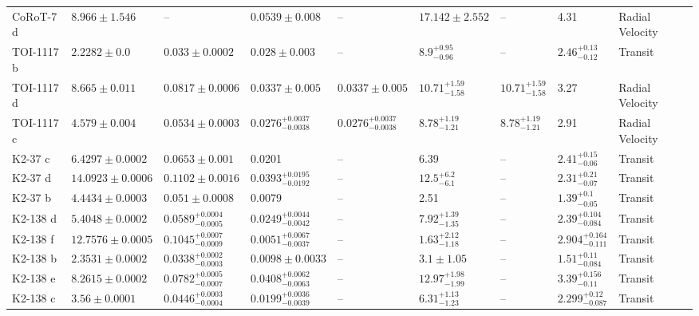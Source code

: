 \begin{tabular}{llllllllll}
CoRoT-7 d & $8.966 \pm 1.546$ & -- & $0.0539 \pm 0.008$ & -- & $17.142 \pm 2.552$ & -- & 4.31 & Radial Velocity & \cite{JOHN_ET_AL_2022} \\
TOI-1117 b & $2.2282 \pm 0.0$ & $0.033 \pm 0.0002$ & $0.028 \pm 0.003$ & -- & $8.9^{+0.95}_{-0.96}$ & -- & $2.46^{+0.13}_{-0.12}$ & Transit & \cite{LOCKLEY_ET_AL_2025} \\
TOI-1117 d & $8.665 \pm 0.011$ & $0.0817 \pm 0.0006$ & $0.0337 \pm 0.005$ & $0.0337 \pm 0.005$ & $10.71^{+1.59}_{-1.58}$ & $10.71^{+1.59}_{-1.58}$ & 3.27 & Radial Velocity & \cite{LOCKLEY_ET_AL_2025} \\
TOI-1117 c & $4.579 \pm 0.004$ & $0.0534 \pm 0.0003$ & $0.0276^{+0.0037}_{-0.0038}$ & $0.0276^{+0.0037}_{-0.0038}$ & $8.78^{+1.19}_{-1.21}$ & $8.78^{+1.19}_{-1.21}$ & 2.91 & Radial Velocity & \cite{LOCKLEY_ET_AL_2025} \\
K2-37 c & $6.4297 \pm 0.0002$ & $0.0653 \pm 0.001$ & 0.0201 & -- & 6.39 & -- & $2.41^{+0.15}_{-0.06}$ & Transit & \cite{HOWARD_ET_AL__2025} \\
K2-37 d & $14.0923 \pm 0.0006$ & $0.1102 \pm 0.0016$ & $0.0393^{+0.0195}_{-0.0192}$ & -- & $12.5^{+6.2}_{-6.1}$ & -- & $2.31^{+0.21}_{-0.07}$ & Transit & \cite{HOWARD_ET_AL__2025} \\
K2-37 b & $4.4434 \pm 0.0003$ & $0.051 \pm 0.0008$ & 0.0079 & -- & 2.51 & -- & $1.39^{+0.1}_{-0.05}$ & Transit & \cite{HOWARD_ET_AL__2025} \\
K2-138 d & $5.4048 \pm 0.0002$ & $0.0589^{+0.0004}_{-0.0005}$ & $0.0249^{+0.0044}_{-0.0042}$ & -- & $7.92^{+1.39}_{-1.35}$ & -- & $2.39^{+0.104}_{-0.084}$ & Transit & \cite{LOPEZ_ET_AL__2019} \\
K2-138 f & $12.7576 \pm 0.0005$ & $0.1045^{+0.0007}_{-0.0009}$ & $0.0051^{+0.0067}_{-0.0037}$ & -- & $1.63^{+2.12}_{-1.18}$ & -- & $2.904^{+0.164}_{-0.111}$ & Transit & \cite{LOPEZ_ET_AL__2019} \\
K2-138 b & $2.3531 \pm 0.0002$ & $0.0338^{+0.0002}_{-0.0003}$ & $0.0098 \pm 0.0033$ & -- & $3.1 \pm 1.05$ & -- & $1.51^{+0.11}_{-0.084}$ & Transit & \cite{LOPEZ_ET_AL__2019} \\
K2-138 e & $8.2615 \pm 0.0002$ & $0.0782^{+0.0005}_{-0.0007}$ & $0.0408^{+0.0062}_{-0.0063}$ & -- & $12.97^{+1.98}_{-1.99}$ & -- & $3.39^{+0.156}_{-0.11}$ & Transit & \cite{LOPEZ_ET_AL__2019} \\
K2-138 c & $3.56 \pm 0.0001$ & $0.0446^{+0.0003}_{-0.0004}$ & $0.0199^{+0.0036}_{-0.0039}$ & -- & $6.31^{+1.13}_{-1.23}$ & -- & $2.299^{+0.12}_{-0.087}$ & Transit & \cite{LOPEZ_ET_AL__2019} \\

\end{tabular}
